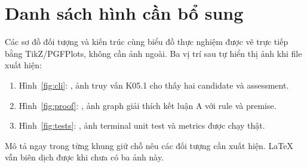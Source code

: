 \section{Danh sách hình cần bổ sung}
Các sơ đồ đối tượng và kiến trúc cùng biểu đồ thực nghiệm được vẽ trực
tiếp bằng TikZ/PGFPlots, không cần ảnh ngoài.
Ba vị trí sau tự hiển thị ảnh khi file xuất hiện:
\begin{enumerate}
 \item Hình~\ref{fig:cli}: , ảnh truy vấn K05.1
       cho thấy hai candidate và assessment.
 \item Hình~\ref{fig:proof}: , ảnh graph giải
       thích kết luận A với rule và premise.
 \item Hình~\ref{fig:tests}: , ảnh terminal
       unit test và metrics được chạy thật.
\end{enumerate}
Mô tả ngay trong từng khung giữ chỗ nêu các đối tượng cần xuất hiện.
LaTeX vẫn biên dịch được khi chưa có ba ảnh này.
